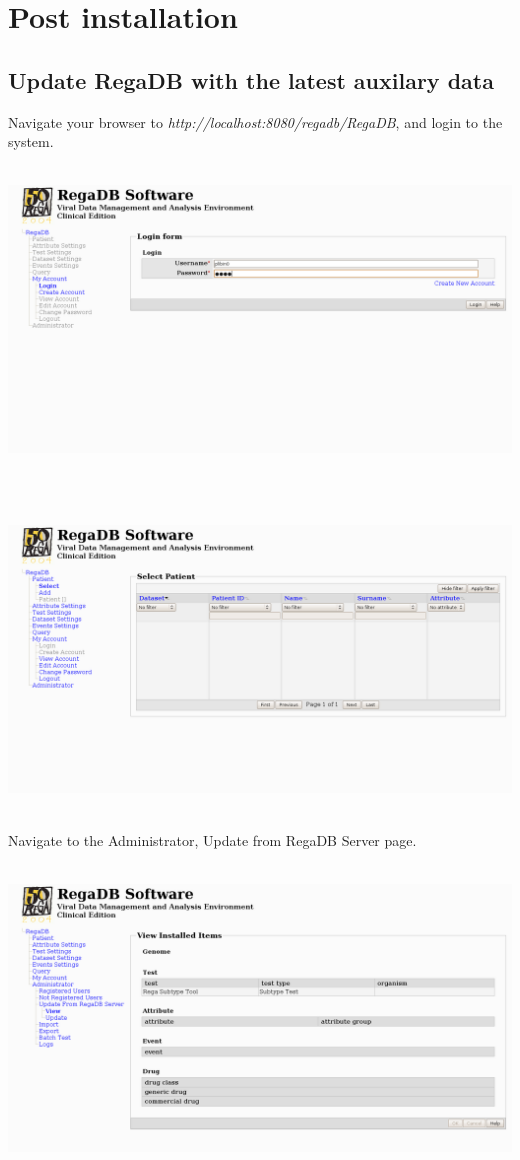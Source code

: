 \chapter{Post installation}
\label{chapter:post_install}

\section{Update RegaDB with the latest auxilary data}
Navigate your browser to \textit{http://localhost:8080/regadb/RegaDB}, and login to the system.
\\
\vspace{0.5cm}~ \\ \centerline{\includegraphics[width=15cm] {pics/auxilary/aux_1.png}}
\\
\vspace{0.5cm}~ \\ \centerline{\includegraphics[width=15cm] {pics/auxilary/aux_2.png}}
\\
Navigate to the Administrator, Update from RegaDB Server page.
\\
\vspace{0.5cm}~ \\ \centerline{\includegraphics[width=15cm] {pics/auxilary/aux_3.png}}
